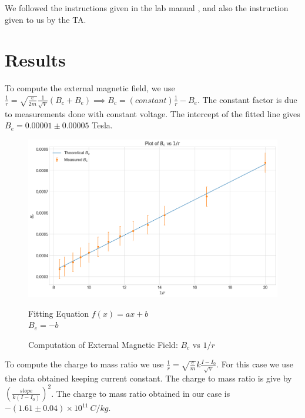\documentclass[a4paper,12pt]{article}
\begin{document}
We followed the instructions given in the lab manual \cite{lab-manual-ex8}, and also the instruction given to us by the TA.

\section{Results}

To compute the external magnetic field, we use $\frac{1}{r} = \sqrt{\frac{e}{2m}}\frac{1}{\sqrt{V}}(B_c + B_e) \implies B_c = (constant)\frac{1}{r} - B_e$. 
The constant factor is due to measurements done with constant voltage. The intercept of the fitted line gives $B_e = 0.00001 \pm 0.00005$ Tesla.

\begin{figure}[H]
  \centering
  \includegraphics[width=0.8\linewidth]{../code/Pankaj/Coil B vs r_1.png} 
  \begin{center}
    Fitting Equation $f(x) = ax+b$ \\
    $B_e = -b$
  \end{center}  
    \caption{Computation of External Magnetic Field: $B_c$ vs $1/r$}
    \label{b_e}
\end{figure}

To compute the charge to mass ratio we use $\frac{1}{r} = \sqrt{\frac{e}{m}}k\frac{I-I_0}{\sqrt{V}}$. For this case we use the data
obtained keeping current constant. The charge to mass ratio is give by $(\frac{slope}{k(I-I_0)})^2$. The charge to mass ratio
obtained in our case is $-(1.61 \pm 0.04) \times 10^{11}\ C/kg$.
\end{document}
